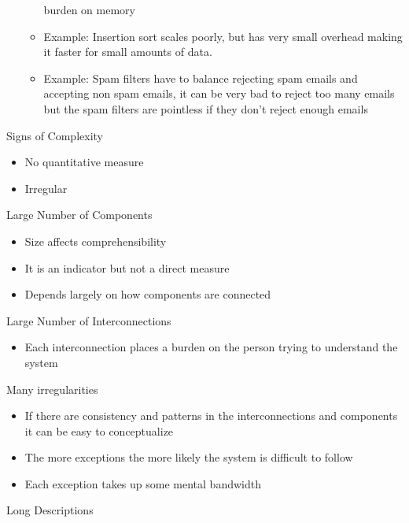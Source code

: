 \documentclass{report}
\begin{document}
\begin{description}
\begin{itemize}
\begin{itemize}
                        burden on memory
                    \item Example: Insertion sort scales poorly, but has very small overhead making
                        it faster for small amounts of data.
                    \item Example: Spam filters have to balance rejecting spam emails and
                        accepting non spam emails, it can be very bad to reject too many
                        emails but the spam filters are pointless if they don't reject enough
                        emails
                \end{itemize}
        \end{itemize}
    \item Signs of Complexity
        \begin{itemize}
            \item No quantitative measure
            \item Irregular
        \end{itemize}
    \item Large Number of Components
        \begin{itemize}
            \item Size affects comprehensibility
            \item It is an indicator but not a direct
                measure
            \item Depends largely on how components are connected
        \end{itemize}
    \item Large Number of Interconnections
        \begin{itemize}
            \item Each interconnection places a burden on the person
                trying to understand the system
        \end{itemize}
    \item Many irregularities
        \begin{itemize}
            \item If there are consistency and patterns in the interconnections
                and components it can be easy to conceptualize
            \item The more exceptions the more likely the system is difficult
                to follow
            \item Each exception takes up some mental bandwidth
        \end{itemize}
    \item Long Descriptions

\end{description}
\end{document}
